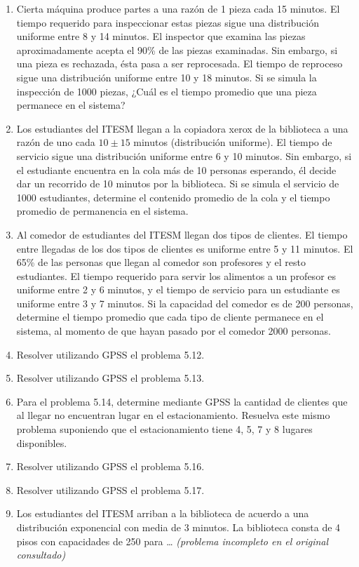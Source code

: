 \documentclass[11pt,letterpaper]{report}
\begin{document}
\begin{enumerate}
\item[7.1.] Cierta máquina produce partes a una razón de 1 pieza cada
15 minutos. El tiempo requerido para inspeccionar estas piezas sigue
una distribución uniforme entre 8 y 14 minutos. El inspector que
examina las piezas aproximadamente acepta el 90\% de las piezas
examinadas. Sin embargo, si una pieza es rechazada, ésta pasa a ser
reprocesada. El tiempo de reproceso sigue una distribución uniforme
entre 10 y 18 minutos. Si se simula la inspección de 1000 piezas,
¿Cuál es el tiempo promedio que una pieza permanece en el sistema?

\item[7.2.] Los estudiantes del ITESM llegan a la copiadora xerox de la
biblioteca a una razón de uno cada $10 \pm 15$ minutos (distribución
uniforme). El tiempo de servicio sigue una distribución uniforme entre
6 y 10 minutos. Sin embargo, si el estudiante encuentra en la cola más
de 10 personas esperando, él decide dar un recorrido de 10 minutos por
la biblioteca. Si se simula el servicio de 1000 estudiantes, determine
el contenido promedio de la cola y el tiempo promedio de permanencia en
el sistema.

\item[7.3.] Al comedor de estudiantes del ITESM llegan dos tipos de
clientes. El tiempo entre llegadas de los dos tipos de clientes es
uniforme entre 5 y 11 minutos. El 65\% de las personas que llegan al
comedor son profesores y el resto estudiantes. El tiempo requerido para
servir los alimentos a un profesor es uniforme entre 2 y 6 minutos, y el
tiempo de servicio para un estudiante es uniforme entre 3 y 7 minutos.
Si la capacidad del comedor es de 200 personas, determine el tiempo
promedio que cada tipo de cliente permanece en el sistema, al momento
de que hayan pasado por el comedor 2000 personas.

\item[7.4.] Resolver utilizando GPSS el problema 5.12.
\item[7.5.] Resolver utilizando GPSS el problema 5.13.
\item[7.6.] Para el problema 5.14, determine mediante GPSS la cantidad
de clientes que al llegar no encuentran lugar en el estacionamiento.
Resuelva este mismo problema suponiendo que el estacionamiento tiene 4,
5, 7 y 8 lugares disponibles.
\item[7.7.] Resolver utilizando GPSS el problema 5.16.
\item[7.8.] Resolver utilizando GPSS el problema 5.17.
\item[7.9.] Los estudiantes del ITESM arriban a la biblioteca de
acuerdo a una distribución exponencial con media de 3 minutos. La
biblioteca consta de 4 pisos con capacidades de 250 para \ldots
\emph{(problema incompleto en el original consultado)}
\end{enumerate}
\end{document}
